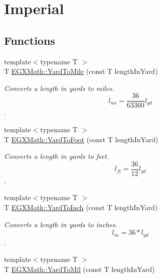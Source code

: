 \hypertarget{group___e_g_x_math-_conversions-_length_conversions-_imperial-_yard-_imperial}{}\section{Imperial}
\label{group___e_g_x_math-_conversions-_length_conversions-_imperial-_yard-_imperial}
\subsection*{Functions}
\begin{DoxyCompactItemize}
\item 
{\footnotesize template$<$typename T $>$ }\\T \mbox{\hyperlink{group___e_g_x_math-_conversions-_length_conversions-_imperial-_yard-_imperial_ga8bd451c3f9a1af1afb769812587d7dc6}{E\+G\+X\+Math\+::\+Yard\+To\+Mile}} (const T length\+In\+Yard)
\begin{DoxyCompactList}\small\item\em Converts a length in yards to miles. \[ l_{mi}=\frac{36}{63360} l_{yd} \]. \end{DoxyCompactList}\item 
{\footnotesize template$<$typename T $>$ }\\T \mbox{\hyperlink{group___e_g_x_math-_conversions-_length_conversions-_imperial-_yard-_imperial_gaa61dd96db004bb07d9fca00a214fe265}{E\+G\+X\+Math\+::\+Yard\+To\+Foot}} (const T length\+In\+Yard)
\begin{DoxyCompactList}\small\item\em Converts a length in yards to feet. \[ l_{ft}= \frac{36}{12} l_{yd} \]. \end{DoxyCompactList}\item 
{\footnotesize template$<$typename T $>$ }\\T \mbox{\hyperlink{group___e_g_x_math-_conversions-_length_conversions-_imperial-_yard-_imperial_ga081865589d8e67f705080fcc6a7dabe3}{E\+G\+X\+Math\+::\+Yard\+To\+Inch}} (const T length\+In\+Yard)
\begin{DoxyCompactList}\small\item\em Converts a length in yards to inches. \[ l_{in}= 36 * l_{yd} \]. \end{DoxyCompactList}\item 
{\footnotesize template$<$typename T $>$ }\\T \mbox{\hyperlink{group___e_g_x_math-_conversions-_length_conversions-_imperial-_yard-_imperial_ga9ff8041d33178b44c133dbbd37a8b267}{E\+G\+X\+Math\+::\+Yard\+To\+Mil}} (const T length\+In\+Yard)

\end{DoxyCompactItemize}
